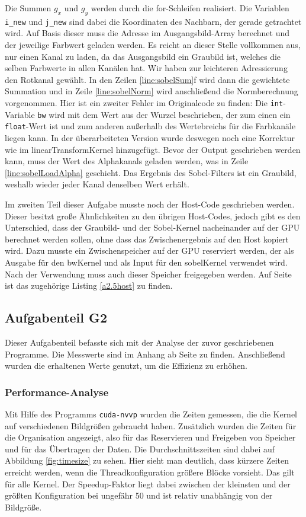 \documentclass[12pt,a4paper]{scrartcl}
\begin{document}
Die Summen $g_x$ und $g_y$ werden durch die for-Schleifen realisiert.
Die Variablen \texttt{i\_new} und \texttt{j\_new} sind dabei die Koordinaten des Nachbarn, der gerade getrachtet wird.
Auf Basis dieser muss die Adresse im Ausgangsbild-Array berechnet und der jeweilige Farbwert geladen werden.
Es reicht an dieser Stelle vollkommen aus, nur einen Kanal zu laden, da das Ausgangsbild ein Graubild ist, welches die selben Farbwerte in allen Kan\"alen hat.
Wir haben zur leichteren Adressierung den Rotkanal gew\"ahlt.
In den Zeilen \ref{line:sobelSum}f wird dann die gewichtete Summation und in Zeile \ref{line:sobelNorm} wird anschlie\ss end die Normberechnung vorgenommen.
Hier ist ein zweiter Fehler im Originalcode zu finden:
Die \texttt{int}-Variable \texttt{bw} wird mit dem Wert aus der Wurzel beschrieben, der zum einen ein \texttt{float}-Wert ist und zum anderen au\ss{}erhalb des Wertebreichs f\"ur die Farbkan\"ale liegen kann.
In der \"uberarbeiteten Version wurde deswegen noch eine Korrektur wie im linearTransformKernel hinzugef\"ugt.
Bevor der Output geschrieben werden kann, muss der Wert des Alphakanals geladen werden, was in Zeile \ref{line:sobelLoadAlpha} geschieht.
Das Ergebnis des Sobel-Filters ist ein Graubild, weshalb wieder jeder Kanal denselben Wert erh\"alt.

Im zweiten Teil dieser Aufgabe musste noch der Host-Code geschrieben werden.
Dieser besitzt gro\ss{}e \"Ahnlichkeiten zu den \"ubrigen Host-Codes, jedoch gibt es den Unterschied, dass der Graubild- und der Sobel-Kernel nacheinander auf der GPU berechnet werden sollen, ohne dass das Zwischenergebnis auf den Host kopiert wird.
Dazu musste ein Zwischenspeicher auf der GPU reserviert werden, der als Ausgabe f\"ur den bwKernel und als Input f\"ur den sobelKernel verwendet wird.
Nach der Verwendung muss auch dieser Speicher freigegeben werden.
Auf Seite \pageref{a2.5host} ist das zugeh\"orige Listing \ref{a2.5host} zu finden.

\subsection{Aufgabenteil G2}
Dieser Aufgabenteil befasste sich mit der Analyse der zuvor geschriebenen Programme.
Die Messwerte sind im Anhang ab Seite \pageref{ergebnisse} zu finden.
Anschlie\ss{}end wurden die erhaltenen Werte genutzt, um die Effizienz zu erh\"ohen.

\subsubsection{Performance-Analyse}
Mit Hilfe des Programms \texttt{cuda-nvvp} wurden die Zeiten gemessen, die die Kernel auf verschiedenen Bildgr\"o\ss{}en gebraucht haben.
Zus\"atzlich wurden die Zeiten f\"ur die Organisation angezeigt, also f\"ur das Reservieren und Freigeben von Speicher und f\"ur das \"Ubertragen der Daten.
Die Durchschnittszeiten sind dabei auf Abbildung \ref{fig:timesize} zu sehen.
Hier sieht man deutlich, dass k\"urzere Zeiten erreicht werden, wenn die Threadkonfiguration gr\"o\ss{}ere Bl\"ocke vorsieht.
Das gilt f\"ur alle Kernel.
Der Speedup-Faktor liegt dabei zwischen der kleinsten und der gr\"o\ss{}ten Konfiguration bei ungef\"ahr 50 und ist relativ unabh\"angig von der Bildgr\"o\ss{}e.
\end{document}
